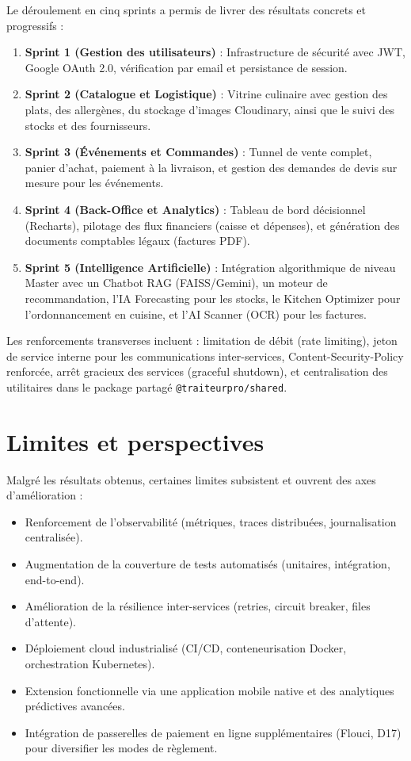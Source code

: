 Le déroulement en cinq sprints a permis de livrer des résultats concrets et progressifs :
\begin{enumerate}
    \item \textbf{Sprint 1 (Gestion des utilisateurs)} : Infrastructure de sécurité avec JWT, Google OAuth 2.0, vérification par email et persistance de session.
    \item \textbf{Sprint 2 (Catalogue et Logistique)} : Vitrine culinaire avec gestion des plats, des allergènes, du stockage d'images Cloudinary, ainsi que le suivi des stocks et des fournisseurs.
    \item \textbf{Sprint 3 (Événements et Commandes)} : Tunnel de vente complet, panier d'achat, paiement à la livraison, et gestion des demandes de devis sur mesure pour les événements.
    \item \textbf{Sprint 4 (Back-Office et Analytics)} : Tableau de bord décisionnel (Recharts), pilotage des flux financiers (caisse et dépenses), et génération des documents comptables légaux (factures PDF).
    \item \textbf{Sprint 5 (Intelligence Artificielle)} : Intégration algorithmique de niveau Master avec un Chatbot RAG (FAISS/Gemini), un moteur de recommandation, l'IA Forecasting pour les stocks, le Kitchen Optimizer pour l'ordonnancement en cuisine, et l'AI Scanner (OCR) pour les factures.
\end{enumerate}

Les renforcements transverses incluent : limitation de débit (rate limiting), jeton de service interne pour les communications inter-services, Content-Security-Policy renforcée, arrêt gracieux des services (graceful shutdown), et centralisation des utilitaires dans le package partagé \texttt{@traiteurpro/shared}.

\section*{Limites et perspectives}

Malgré les résultats obtenus, certaines limites subsistent et ouvrent des axes d'amélioration :

\begin{itemize}
    \item Renforcement de l'observabilité (métriques, traces distribuées, journalisation centralisée).
    \item Augmentation de la couverture de tests automatisés (unitaires, intégration, end-to-end).
    \item Amélioration de la résilience inter-services (retries, circuit breaker, files d'attente).
    \item Déploiement cloud industrialisé (CI/CD, conteneurisation Docker, orchestration Kubernetes).
    \item Extension fonctionnelle via une application mobile native et des analytiques prédictives avancées.
    \item Intégration de passerelles de paiement en ligne supplémentaires (Flouci, D17) pour diversifier les modes de règlement.
\end{itemize}


